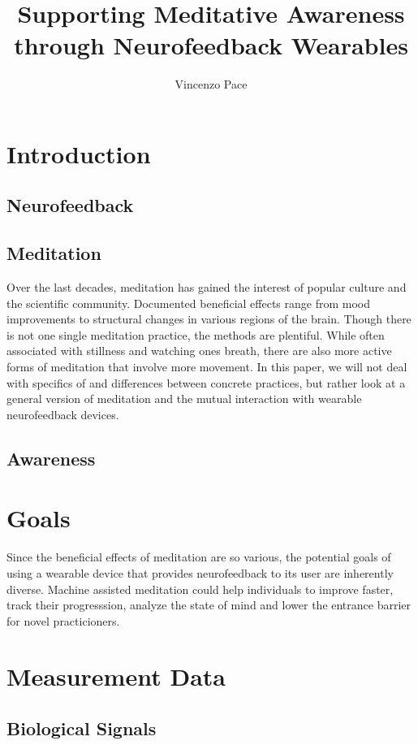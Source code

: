 \documentclass{llncs} %
\begin{document}
\title{Supporting Meditative Awareness through Neurofeedback Wearables}
\author{Vincenzo Pace}
\maketitle
\newpage
\section{Introduction}
\subsection{Neurofeedback}
\subsection{Meditation}
Over the last decades, meditation has gained the interest of popular culture and the scientific community.
Documented beneficial effects range from mood improvements to structural changes in various regions of the brain. \cite{Tang:et al}
Though there is not one single meditation practice, the methods are plentiful. While often associated with stillness and watching ones breath,
there are also more active forms of meditation that involve more movement. In this paper, we will not deal with specifics of and differences between concrete
practices, but rather look at a general version of meditation and the mutual interaction with wearable neurofeedback devices.
\subsection{Awareness}
\section{Goals}
Since the beneficial effects of meditation are so various, the potential goals of using a wearable device 
that provides neurofeedback to its user are inherently diverse. Machine assisted meditation could help individuals to 
improve faster, track their progresssion, analyze the state of mind and lower the entrance barrier for novel practicioners. \cite{brand:del} \

\section{Measurement Data}
\subsection{Biological Signals}
\end{document}
